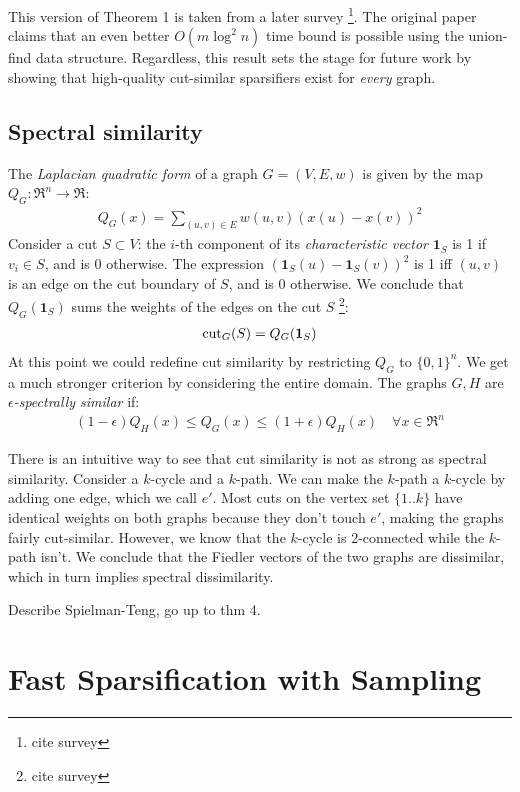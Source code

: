 \documentclass{article}
\begin{document}
This version of Theorem 1 is taken from a later survey \footnote{cite
survey}. The original paper claims that an even better $O(m\log^2 n)$ time
bound is possible using the union-find data structure. Regardless, this
result sets the stage for future work by showing that high-quality
cut-similar sparsifiers exist for \textit{every} graph. 

\subsection{Spectral similarity}

The \textit{Laplacian quadratic form} of a graph $G = (V, E, w)$ is given by
the map $Q_G : \Re^n \rightarrow \Re$:
\begin{align*}
    Q_G(x) = \sum_{(u, v) \in E} w(u, v)(x(u) - x(v))^2
\end{align*}
Consider a cut $S \subset V$: the $i$-th component of its
\textit{characteristic vector} $\mathbf{1}_S$ is 1 if $v_i \in S$, and is 0
otherwise. The expression $(\mathbf{1}_S(u) - \mathbf{1}_S(v))^2$ is 1 iff
$(u, v)$ is an edge on the cut boundary of $S$, and is 0 otherwise. We
conclude that $Q_G(\mathbf{1}_S)$ sums the weights of the edges on the cut
$S$ \footnote{cite survey}:
\begin{align*}
    \text{cut}_{G}(S) = Q_G(\mathbf{1}_S)
\end{align*}
At this point we could redefine cut similarity by restricting $Q_G$ to $\{0,
1\}^n$. We get a much stronger criterion by considering the entire domain.
The graphs $G, H$ are \textit{$\epsilon$-spectrally similar} if:
\begin{align*}
    (1 - \epsilon)Q_H(x) \leq Q_G(x) \leq (1 + \epsilon)Q_H(x) \quad
    \forall{x \in \Re^n}
\end{align*}

There is an intuitive way to see that cut similarity is not as strong as
spectral similarity. Consider a $k$-cycle and a $k$-path. We can make the
$k$-path a $k$-cycle by adding one edge, which we call $e'$. Most cuts on
the vertex set $\{1..k\}$ have identical weights on both graphs because they
don't touch $e'$, making the graphs fairly cut-similar. However, we know
that the $k$-cycle is 2-connected while the $k$-path isn't. We conclude that
the Fiedler vectors of the two graphs are dissimilar, which in turn implies
spectral dissimilarity.

Describe Spielman-Teng, go up to thm 4.

\section{Fast Sparsification with Sampling}
\end{document}

